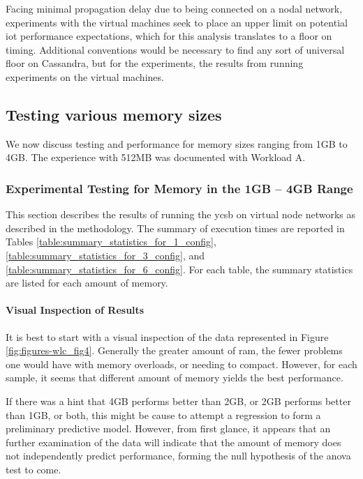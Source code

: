 Facing minimal propagation delay due to being connected on a nodal network, experiments with the virtual machines seek to place an upper limit on potential \gls{iot} performance expectations, which for this analysis translates to a floor on timing.  Additional conventions would be necessary to find any sort of universal floor on Cassandra, but for the experiments, the results from running experiments on the virtual machines.

\subsection{Testing various memory sizes}

We now discuss testing and performance for memory sizes ranging from 1GB to 4GB.  The experience with 512MB was documented with Workload A.

\subsubsection{Experimental Testing for Memory in the 1GB – 4GB Range}

This section describes the results of running the \gls{ycsb} on virtual node networks as described in the methodology.  The summary of execution times are reported in Tables \ref{table:summary_statistics_for_1_config}, \ref{table:summary_statistics_for_3_config}, and \ref{table:summary_statistics_for_6_config}.  For each table, the summary statistics are listed for each amount of memory.

\paragraph{Visual Inspection of Results}

It is best to start with a visual inspection of the data represented in Figure \ref{fig:figures-wlc_fig4}.  Generally the greater amount of \gls{ram}, the fewer problems one would have with memory overloads, or needing to compact. However, for each sample, it seems that different amount of memory yields the best performance.

If there was a hint that 4GB performs better than 2GB, or 2GB performs better than 1GB, or both, this might be cause to attempt a regression to form a preliminary predictive model.  However, from first glance, it appears that an further examination of the data will indicate that the amount of memory does not independently predict performance, forming the null hypothesis of the \gls{anova} test to come.

